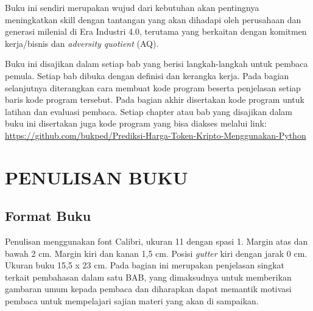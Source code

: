 \documentclass{bukupedia}
\begin{document}
Buku ini sendiri merupakan wujud dari kebutuhan akan pentingnya
meningkatkan skill dengan tantangan yang akan dihadapi oleh perusahaan
dan generasi milenial di Era Industri 4.0, terutama yang berkaitan
dengan komitmen kerja/bisnis dan \textit{adversity quotient} (AQ).

Buku ini disajikan dalam setiap bab yang berisi langkah-langkah untuk
pembaca pemula. Setiap bab dibuka dengan definisi dan kerangka kerja.
Pada bagian selanjutnya diterangkan cara membuat kode program beserta
penjelasan setiap baris kode program tersebut. Pada bagian akhir
disertakan kode program untuk latihan dan evaluasi pembaca. Setiap
chapter atau bab yang disajikan dalam buku ini disertakan juga kode
program yang bisa diakses melalui link:
\url{https://github.com/bukped/Prediksi-Harga-Token-Kripto-Menggunakan-Python}

\daftarisi

\mainmatter

\chapter{PENULISAN BUKU}

\section{Format Buku}
Penulisan menggunakan font Calibri, ukuran 11 dengan spasi 1. Margin
atas dan bawah 2 cm. Margin kiri dan kanan 1,5 cm. Posisi
\textit{gutter} kiri dengan jarak 0 cm. Ukuran buku 15,5 x
23 cm. Pada bagian ini merupakan penjelasan singkat terkait pembahasan
dalam satu BAB, yang dimaksudnya untuk memberikan gambaran umum kepada
pembaca dan diharapkan dapat memantik motivasi pembaca untuk mempelajari
sajian materi yang akan di sampaikan.
\end{document}

